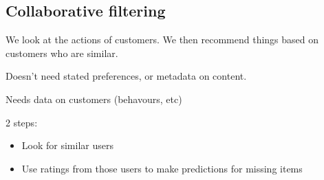 
\subsection{Collaborative filtering}

We look at the actions of customers. We then recommend things based on customers who are similar.

Doesn't need stated preferences, or metadata on content.

Needs data on customers (behavours, etc)

2 steps:

\begin{itemize}
\item Look for similar users
\item Use ratings from those users to make predictions for missing items
\end{itemize}


